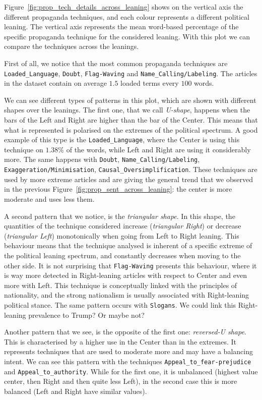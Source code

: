 Figure~\ref{fig:prop_tech_details_across_leaning} shows on the vertical axis the different propaganda techniques, and each colour represents a different political leaning. The vertical axis represents the mean word-based percentage of the specific propaganda technique for the considered leaning.
With this plot we can compare the techniques across the leanings.

First of all, we notice that the most common propaganda techniques are \texttt{Loaded\_Language}, \texttt{Doubt}, \texttt{Flag-Waving} and \texttt{Name\_Calling/Labeling}.
The articles in the dataset contain on average $1.5$ loaded terms every $100$ words.

We can see different types of patterns in this plot, which are shown with different shapes over the leanings.
The first one, that we call \emph{U-shape}, happens when the bars of the Left and Right are higher than the bar of the Center. This means that what is represented is polarised on the extremes of the political spectrum.
A good example of this type is the \texttt{Loaded\_Language}, where the Center is using this technique on $1.38\%$ of the words, while Left and Right are using it considerably more.
The same happens with \texttt{Doubt}, \texttt{Name\_Calling/Labeling}, \texttt{Exaggeration/Minimisation}, \texttt{Causal\_Oversimplification}.
These techniques are used by more extreme articles and are giving the general trend that we observed in the previous Figure~\ref{fig:prop_sent_across_leaning}: the center is more moderate and uses less them.

A second pattern that we notice, is the \emph{triangular shape}. In this shape, the quantities of the technique considered increase (\emph{triangular Right}) or decrease (\emph{triangular Left}) monotonically when going from Left to Right leaning.
This behaviour means that the technique analysed is inherent of a specific extreme of the political leaning spectrum, and constantly decreases when moving to the other side.
It is not surprising that \texttt{Flag-Waving} presents this behaviour, where it is way more detected in Right-leaning articles with respect to Center and even more with Left. This technique is conceptually linked with the principles of nationality, and the strong nationalism is usually associated with Right-leaning political stance.
The same pattern occurs with \texttt{Slogans}. We could link this Right-leaning prevalence to Trump? Or maybe not? 

Another pattern that we see, is the opposite of the first one: \emph{reversed-U shape}. This is characterised by a higher use in the Center than in the extremes.
It represents techniques that are used to moderate more and may have a balancing intent.
We can see this pattern with the techniques \texttt{Appeal\_to\_fear-prejudice} and \texttt{Appeal\_to\_authority}. While for the first one, it is unbalanced (highest value center, then Right and then quite less Left), in the second case this is more balanced (Left and Right have similar values).


